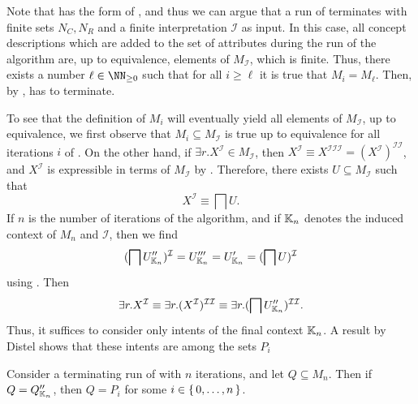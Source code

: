Note that  has the form of
, and thus we can argue that a run of
 terminates with finite sets $N_{C}, N_{R}$ and a finite
interpretation $\mathcal{I}$ as input.  In this case, all concept descriptions which are
added to the set of attributes during the run of the algorithm are, up to equivalence,
elements of $M_{\mathcal{I}}$, which is finite.  Thus, there exists a number $\ell \in
\NN_{\ge 0}$ such that for all $i \geq \ell$ it is true that $M_{i} = M_{\ell}$.  Then, by
,  has to
terminate.

To see that the definition of $M_{i}$ will eventually yield all elements of
$M_{\mathcal{I}}$, up to equivalence, we first observe that $M_{i} \subseteq
M_{\mathcal{I}}$ is true up to equivalence for all iterations $i$ of
.  On the other hand, if $\exists r. X^{\mathcal{I}} \in
M_{\mathcal{I}}$, then $X^{\mathcal{I}} \equiv X^{\mathcal{I}\mathcal{I}\mathcal{I}} =
(X^{\mathcal{I}})^{\mathcal{I}\mathcal{I}}$, and $X^{\mathcal{I}}$ is expressible in terms
of $M_{\mathcal{I}}$ by .  Therefore, there
exists $U \subseteq M_{\mathcal{I}}$ such that
\begin{equation*}
  X^{\mathcal{I}} \equiv \bigsqcap U.
\end{equation*}
If $n$ is the number of iterations of the algorithm, and if ${\mathbb{K}}_{n}$ denotes the
induced context of $M_{n}$ and $\mathcal{I}$, then we find
\begin{equation*}
  (\bigsqcap U_{{\mathbb{K}}_{n}}'')^{\mathcal{I}} = U_{{\mathbb{K}}_{n}}''' = U_{{\mathbb{K}}_{n}}' =
  (\bigsqcap U)^{\mathcal{I}}
\end{equation*}
using .  Then
\begin{equation*}
  \exists r. X^{\mathcal{I}} \equiv \exists r. (X^{\mathcal{I}})^{\mathcal{I}\mathcal{I}}
  \equiv \exists r.(\bigsqcap U_{{\mathbb{K}}_{n}}'')^{\mathcal{I}\mathcal{I}}.
\end{equation*}
Thus, it suffices to consider only intents of the final context ${\mathbb{K}}_{n}$.  A result by
Distel shows that these intents are among the sets $P_{i}$

\begin{Lemma}
  \label{lem:Felix-6.3}
  Consider a terminating run of  with $n$ iterations, and
  let $Q \subseteq M_{n}$.  Then if $Q = Q_{{\mathbb{K}}_{n}}''$, then $Q = P_{i}$ for some $i
  \in {\ensuremath{\{\, 0, \dots, n \,\}}}$.
\end{Lemma}

